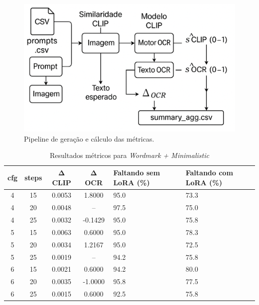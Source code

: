 \documentclass[12pt, %
openright, 
oneside, %
a4paper,    %
brazil]{facom-ufu-abntex2}
\begin{document}
\begin{figure}[ht]
  \centering
  \includegraphics[width=.9\linewidth]{pipeline_metricas_2.png}
  \caption{Pipeline de geração e cálculo das métricas.}
  \label{fig:pipeline-metricas}
\end{figure}

\begin{table}[H]
\centering
\small
\setlength{\tabcolsep}{4pt}
\begin{tabularx}{\linewidth}{|c|c|c|c|X|X|}
\hline
\textbf{cfg} & \textbf{steps} & \(\boldsymbol{\Delta}\) \textbf{CLIP} & \(\boldsymbol{\Delta}\) \textbf{OCR} & \textbf{Faltando sem LoRA (\%)} & \textbf{Faltando com LoRA (\%)} \\ \hline
4 & 15 & 0.0053 & 1.8000  & 95.0 & 73.3 \\ \hline
4 & 20 & 0.0048 & --      & 97.5 & 75.0 \\ \hline
4 & 25 & 0.0032 & -0.1429 & 95.0 & 75.8 \\ \hline
5 & 15 & 0.0063 & 0.6000  & 95.0 & 78.3 \\ \hline
5 & 20 & 0.0034 & 1.2167  & 95.0 & 72.5 \\ \hline
5 & 25 & 0.0019 & --      & 94.2 & 75.8 \\ \hline
6 & 15 & 0.0021 & 0.6000  & 94.2 & 80.0 \\ \hline
6 & 20 & 0.0035 & -1.0000 & 95.8 & 77.5 \\ \hline
6 & 25 & 0.0015 & 0.6000  & 92.5 & 75.8 \\ \hline
\end{tabularx}
\caption{Resultados métricos para \textit{Wordmark + Minimalistic}}
\label{tab:metrics_wm_minimalistic}
\end{table}
\end{document}
